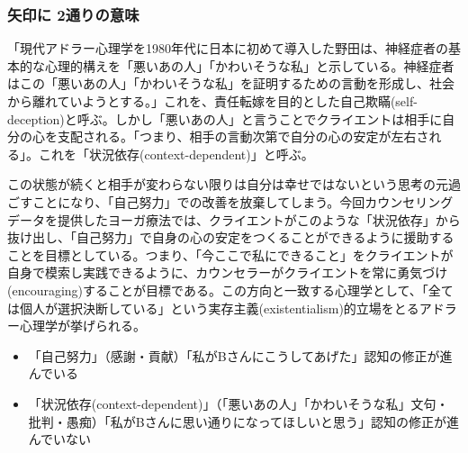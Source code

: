 \documentclass[shuuron]{kuee}
\begin{document}
%

\subsubsection{矢印に
2通りの意味
}


「現代アドラー心理学を1980年代に日本に初めて導入した野田\cite{zokad}は、神経症者の基本的な心理的構えを「悪いあの人」「かわいそうな私」と示している。神経症者はこの「悪いあの人」「かわいそうな私」を証明するための言動を形成し、社会から離れていようとする。」これを、責任転嫁を目的とした自己欺瞞(self-deception)と呼ぶ\cite{Darshana}。しかし「悪いあの人」と言うことでクライエントは相手に自分の心を支配される。「つまり、相手の言動次第で自分の心の安定が左右される」。これを「状況依存(context-dependent)」と呼ぶ。

この状態が続くと相手が変わらない限りは自分は幸せではないという思考の元過ごすことになり、「自己努力」での改善を放棄してしまう。今回カウンセリングデータを提供したヨーガ療法では、クライエントがこのような「状況依存」から抜け出し、「自己努力」で自身の心の安定をつくることができるように援助することを目標としている。つまり、「今ここで私にできること」をクライエントが自身で模索し実践できるように、カウンセラーがクライエントを常に勇気づけ(encouraging)することが目標である。この方向と一致する心理学として、「全ては個人が選択決断している」という実存主義(existentialism)的立場をとるアドラー心理学が挙げられる。

\begin{itemize}
  \item 「自己努力」（感謝・貢献）「私がBさんにこうしてあげた」認知の修正が進んでいる
  \item 「状況依存(context-dependent)」（「悪いあの人」「かわいそうな私」文句・批判・愚痴）「私がBさんに思い通りになってほしいと思う」認知の修正が進んでいない
\end{itemize}
\end{document}
